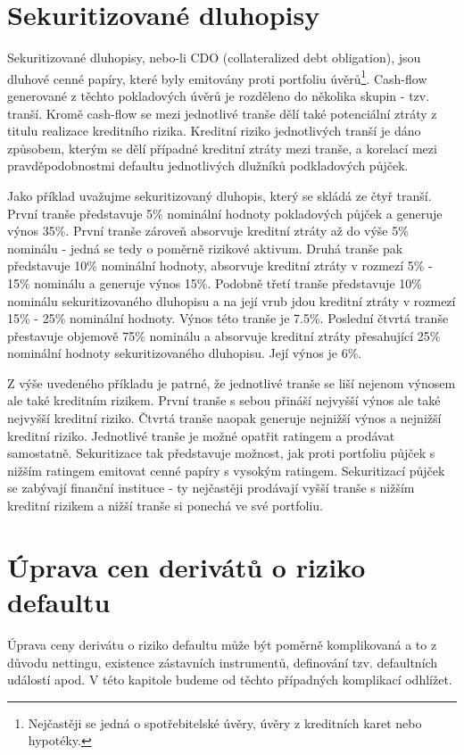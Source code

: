 \documentclass[a4paper]{book}
\begin{document}
\section{Sekuritizované dluhopisy}
Sekuritizované dluhopisy, nebo-li CDO (collateralized debt obligation), jsou dluhové cenné papíry, které byly emitovány proti portfoliu úvěrů\footnote{Nejčastěji se jedná o spotřebitelské úvěry, úvěry z kreditních karet nebo hypotéky.}. Cash-flow generované z těchto pokladových úvěrů je rozděleno do několika skupin - tzv. tranší. Kromě cash-flow se mezi jednotlivé tranše dělí také potenciální ztráty z titulu realizace kreditního rizika. Kreditní riziko jednotlivých tranší je dáno způsobem, kterým se dělí případné kreditní ztráty mezi tranše, a korelací mezi pravděpodobnostmi defaultu jednotlivých dlužníků podkladových půjček.

Jako příklad uvažujme sekuritizovaný dluhopis, který se skládá ze čtyř tranší. První tranše představuje 5\% nominální hodnoty pokladových půjček a generuje výnos 35\%. První tranše zároveň absorvuje kreditní ztráty až do výše 5\% nominálu - jedná se tedy o poměrně rizikové aktivum. Druhá tranše pak představuje 10\% nominální hodnoty, absorvuje kreditní ztráty v rozmezí 5\% - 15\% nominálu a generuje výnos 15\%. Podobně třetí tranše představuje 10\% nominálu sekuritizovaného dluhopisu a na její vrub jdou kreditní ztráty v rozmezí 15\% - 25\% nominální hodnoty. Výnos této tranše je 7.5\%. Poslední čtvrtá tranše přestavuje objemově 75\% nominálu a absorvuje kreditní ztráty přesahující 25\% nominální hodnoty sekuritizovaného dluhopisu. Její výnos je 6\%.

Z výše uvedeného příkladu je patrné, že jednotlivé tranše se liší nejenom výnosem ale také kreditním rizikem. První tranše s sebou přináší nejvyšší výnos ale také nejvyšší kreditní riziko. Čtvrtá tranše naopak generuje nejnižší výnos a nejnižší kreditní riziko. Jednotlivé tranše je možné opatřit ratingem a prodávat samostatně. Sekuritizace tak představuje možnost, jak proti portfoliu půjček s nižším ratingem emitovat cenné papíry s vysokým ratingem. Sekuritizací půjček se zabývají finanční instituce - ty nejčastěji prodávají vyšší tranše s nižším kreditní rizikem a nižší tranše si ponechá ve své portfoliu.

\section{Úprava cen derivátů o riziko defaultu}
Úprava ceny derivátu o riziko defaultu může být poměrně komplikovaná a to z důvodu nettingu, existence zástavních instrumentů, definování tzv. defaultních událostí apod. V této kapitole budeme od těchto případných komplikací odhlížet.
\end{document}
